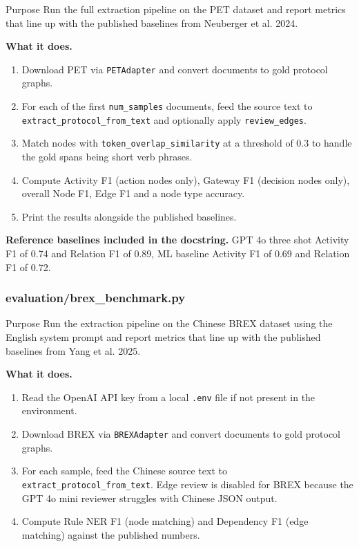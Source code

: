 \documentclass{article}
\begin{document}
\begin{codeconceptbox}{Purpose}
Run the full extraction pipeline on the PET dataset and report
metrics that line up with the published baselines from
Neuberger et al. 2024.
\end{codeconceptbox}

\textbf{What it does.}

\begin{enumerate}[leftmargin=2em]
    \item Download PET via \texttt{PETAdapter} and convert documents
    to gold protocol graphs.
    \item For each of the first \texttt{num\_samples} documents, feed
    the source text to \texttt{extract\_protocol\_from\_text} and
    optionally apply \texttt{review\_edges}.
    \item Match nodes with \texttt{token\_overlap\_similarity} at a
    threshold of 0.3 to handle the gold spans being short verb
    phrases.
    \item Compute Activity F1 (action nodes only), Gateway F1
    (decision nodes only), overall Node F1, Edge F1 and a node type
    accuracy.
    \item Print the results alongside the published baselines.
\end{enumerate}

\textbf{Reference baselines included in the docstring.} GPT 4o three
shot Activity F1 of 0.74 and Relation F1 of 0.89, ML baseline
Activity F1 of 0.69 and Relation F1 of 0.72.

\subsubsection{evaluation/brex\_benchmark.py}

\begin{codeconceptbox}{Purpose}
Run the extraction pipeline on the Chinese BREX dataset using the
English system prompt and report metrics that line up with the
published baselines from Yang et al. 2025.
\end{codeconceptbox}

\textbf{What it does.}

\begin{enumerate}[leftmargin=2em]
    \item Read the OpenAI API key from a local \texttt{.env} file if
    not present in the environment.
    \item Download BREX via \texttt{BREXAdapter} and convert documents
    to gold protocol graphs.
    \item For each sample, feed the Chinese source text to
    \texttt{extract\_protocol\_from\_text}. Edge review is disabled
    for BREX because the GPT 4o mini reviewer struggles with Chinese
    JSON output.
    \item Compute Rule NER F1 (node matching) and Dependency F1
    (edge matching) against the published numbers.
\end{enumerate}
\end{document}
